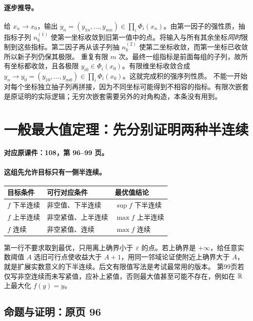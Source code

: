 \paragraph{逐步推导。}
给 $x_n\to x_0$，输出 $y_n=(y_{1n},\ldots,y_{mn})\in\prod_i\Phi_i(x_n)$。由第一因子的强性质，抽指标子列 $n^{(1)}_k$ 使第一坐标收敛到旧第一值中的点。将输入与所有其余坐标\emph{同时}限制到这些指标。第二因子再从该子列抽 $n^{(2)}_k$ 使第二坐标收敛，而第一坐标已收敛所以新子列仍保其极限。
重复有限 $m$ 次。最终一组指标是前面每组的子列，故所有坐标都收敛，且各极限 $y_{i0}\in\Phi_i(x_0)$。有限维坐标收敛合成 $y_n\to y_0=(y_{10},\ldots,y_{m0})\in\prod_i\Phi_i(x_0)$。这就完成积的强序列性质。
不能一开始对每个坐标独立抽子列再拼接，因为不同坐标可能得到不相容的指标。有限次嵌套是原证明的实际逻辑；无穷次嵌套需要另外的对角构造，本条没有用到。


\clearpage\section{一般最大值定理：先分别证明两种半连续}\label{g:108:96}

\textbf{对应原课件：108，第 96--99 页。}


\paragraph{这组先允许目标只有一侧半连续。}
\begin{center}\begin{tabular}{p{.25\linewidth}p{.34\linewidth}p{.28\linewidth}}\toprule
目标条件&可行对应条件&最优值结论\\\midrule
$f$ 下半连续&非空值、下半连续&$\sup f$ 下半连续\\
$f$ 上半连续&非空紧值、上半连续&$\max f$ 上半连续\\
$f$ 连续&非空紧值、连续&$\max f$ 连续\\\bottomrule\end{tabular}\end{center}
第一行不要求取到最优，只用离上确界小于 $\varepsilon$ 的点。若上确界是 $+\infty$，给任意实数阈值 $A$ 选旧可行点使收益大于 $A+1$，用同一邻域论证使附近上确界大于 $A$，就是扩展实数意义的下半连续。后文有限值写法是考试最常用的版本。
第99页若仅写非空连续而未写紧值，应补上紧值，否则最大值甚至可能不存在，例如在 $\mathbb{R}$ 上最大化 $f(y)=y$。


\subsection{命题与证明：原页 96}

